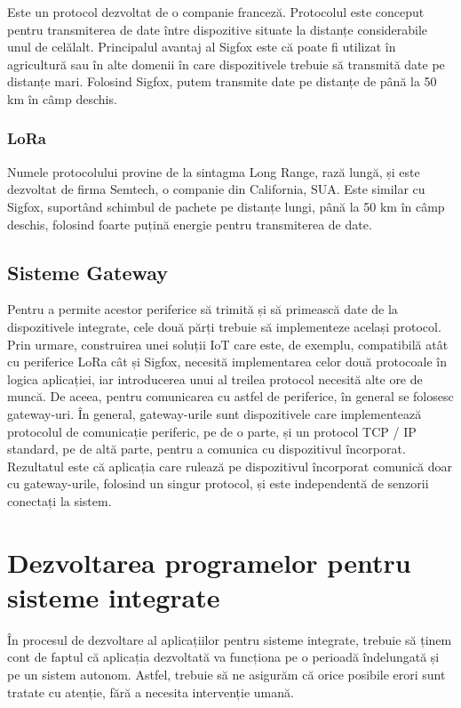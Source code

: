 Este un protocol dezvoltat de o companie franceză. Protocolul este conceput
pentru transmiterea de date între dispozitive situate la distanțe considerabile
unul de celălalt. Principalul avantaj al Sigfox este că poate fi utilizat în
agricultură sau în alte domenii în care dispozitivele trebuie să transmită date
pe distanțe mari. Folosind Sigfox, putem transmite date pe distanțe de până la
50 km în câmp deschis.

\subsubsection{LoRa}
\label{sec:embed-bus-wireless-lora}

Numele protocolului provine de la sintagma Long Range, rază lungă, și este
dezvoltat de firma Semtech, o companie din California, SUA. Este similar cu
Sigfox, suportând schimbul de pachete pe distanțe lungi, până la 50 km în câmp
deschis, folosind foarte puțină energie pentru transmiterea de date.

\subsection{Sisteme Gateway}
\label{sec:embed-bus-gateway}

Pentru a permite acestor periferice să trimită și să primească date de la
dispozitivele integrate, cele două părți trebuie să implementeze același
protocol. Prin urmare, construirea unei soluții IoT care este, de exemplu,
compatibilă atât cu periferice LoRa cât și Sigfox, necesită implementarea celor
două protocoale în logica aplicației, iar introducerea unui al treilea protocol
necesită alte ore de muncă. De aceea, pentru comunicarea cu astfel de
periferice, în general se folosesc gateway-uri. În general, gateway-urile sunt
dispozitivele care implementează protocolul de comunicație periferic, pe de o
parte, și un protocol TCP / IP standard, pe de altă parte, pentru a comunica cu
dispozitivul încorporat. Rezultatul este că aplicația care rulează pe
dispozitivul încorporat comunică doar cu gateway-urile, folosind un singur
protocol, și este independentă de senzorii conectați la sistem.

\section{Dezvoltarea programelor pentru sisteme integrate}
\label{sec:embed-dev}

În procesul de dezvoltare al aplicațiilor pentru sisteme integrate, trebuie să
ținem cont de faptul că aplicația dezvoltată va funcționa pe o perioadă
îndelungată și pe un sistem autonom. Astfel, trebuie să ne asigurăm că orice
posibile erori sunt tratate cu atenție, fără a necesita intervenție umană.

